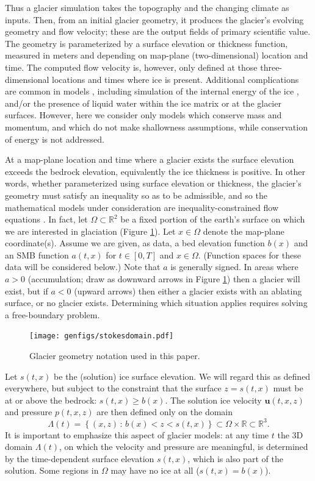 \documentclass[hidelinks,onefignum,onetabnum,final]{siamart220329}  %
\newcommand{\RR}{\mathbb{R}}
\newcommand{\bu}{\mathbf{u}}
\begin{document}
Thus a glacier simulation takes the topography and the changing climate as inputs.  Then, from an initial glacier geometry, it produces the glacier's evolving geometry and flow velocity; these are the output fields of primary scientific value.  The geometry is parameterized by a surface elevation or thickness function, measured in meters and depending on map-plane (two-dimensional) location and time.  The computed flow velocity is, however, only defined at those three-dimensional locations and times where ice is present.  Additional complications are common in models \cite{GreveBlatter2009}, including simulation of the internal energy of the ice \cite{Aschwandenetal2012}, and/or the presence of liquid water within the ice matrix or at the glacier surfaces.  However, here we consider only models which conserve mass and momentum, and which do not make shallowness assumptions, while conservation of energy is not addressed.

At a map-plane location and time where a glacier exists the surface elevation exceeds the bedrock elevation, equivalently the ice thickness is positive.  In other words, whether parameterized using surface elevation or thickness, the glacier's geometry must satisfy an inequality so as to be admissible, and so the mathematical models under consideration are inequality-constrained flow equations \cite{Bueler2021conservation}.  In fact, let $\Omega \subset \RR^2$ be a fixed portion of the earth's surface on which we are interested in glaciation (Figure \ref{fig:stokesdomain}).  Let $x\in\Omega$ denote the map-plane coordinate(s).  Assume we are given, as data, a bed elevation function $b(x)$ and an SMB function $a(t,x)$ for $t\in [0,T]$ and $x\in \Omega$.  (Function spaces for these data will be considered below.)  Note that $a$ is generally signed.  In areas where $a>0$ (accumulation; draw as downward arrows in Figure \ref{fig:stokesdomain}) then a glacier will exist, but if $a<0$ (upward arrows) then either a glacier exists with an ablating surface, or no glacier exists.  Determining which situation applies requires solving a free-boundary problem.

\medskip
\begin{figure}[ht]
\centering
\texttt{[image: genfigs/stokesdomain.pdf]}
\caption{Glacier geometry notation used in this paper.}
\label{fig:stokesdomain}
\end{figure}

\medskip
Let $s(t,x)$ be the (solution) ice surface elevation.  We will regard this as defined everywhere, but subject to the constraint that the surface $z=s(t,x)$ must be at or above the bedrock: $s(t,x) \ge b(x)$.  The solution ice velocity $\bu(t,x,z)$ and pressure $p(t,x,z)$ are then defined only on the domain
\begin{equation}
\Lambda(t) = \left\{(x,z)\,:\,b(x) < z < s(t,x)\right\} \subset \Omega \times \RR \subset \RR^3. \label{eq:icydomain}
\end{equation}
It is important to emphasize this aspect of glacier models: at any time $t$ the 3D domain $\Lambda(t)$, on which the velocity and pressure are meaningful, is determined by the time-dependent surface elevation $s(t,x)$, which is also part of the solution.  Some regions in $\Omega$ may have no ice at all ($s(t,x)=b(x)$).
\end{document}
